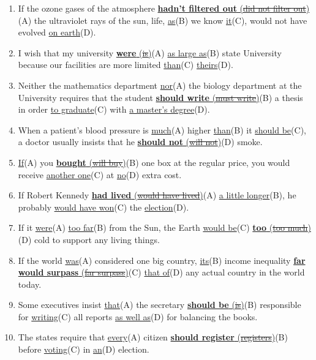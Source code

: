 \documentclass[main.tex]{subfiles}
\begin{document}

\begin{enumerate}[nosep,leftmargin=*]
	\itemsep\eitsp
	\item If the ozone gases of the atmosphere \uline{\textbf{hadn't filtered out} (\sout{did not filter out})}(A) the ultraviolet rays of the sun, life, \uline{as}(B) we know \uline{it}(C), would not have evolved \uline{on earth}(D).
	\item I wish that my university \uline{\textbf{were} (\sout{is})}(A) \uline{as large as}(B) state University because our facilities are more limited \uline{than}(C) \uline{theirs}(D).
	\item Neither the mathematics department \uline{nor}(A) the biology department at the University requires that the student \uline{\textbf{should write} (\sout{must write})}(B) a thesis in order \uline{to graduate}(C) with \uline{a master's degree}(D).
	\item When a patient's blood pressure is \uline{much}(A) higher \uline{than}(B) it \uline{should be}(C), a doctor usually insists that he \uline{\textbf{should not} (\sout{will not})}(D) smoke.
	\item \uline{If}(A) you \uline{\textbf{bought} (\sout{will buy})}(B) one box at the regular price, you would receive \uline{another one}(C) at \uline{no}(D) extra cost.
	\item If Robert Kennedy \uline{\textbf{had lived} (\sout{would have lived})}(A) \uline{a little longer}(B), he probably \uline{would have won}(C) the \uline{election}(D).
	\item If it \uline{were}(A) \uline{too far}(B) from the Sun, the Earth \uline{would be}(C) \uline{\textbf{too} (\sout{too much})}(D) cold to support any living things.
	\item If the world \uline{was}(A) considered one big country, \uline{its}(B) income inequality \uline{\textbf{far would surpass} (\sout{far surpass})}(C) \uline{that of}(D) any actual country in the world today.
	\item Some executives insist \uline{that}(A) the secretary \uline{\textbf{should be} (\sout{is})}(B) responsible for \uline{writing}(C) all reports \uline{as well as}(D) for balancing the books.
	\item The states require that \uline{every}(A) citizen \uline{\textbf{should register} (\sout{registers})}(B) before \uline{voting}(C) in \uline{an}(D) election.
\end{enumerate}
\ 
\end{document}
